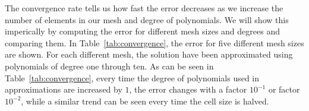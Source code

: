 The convergence rate tells us how fast the error decreases as we increase the number of elements in our mesh and degree of polynomials.
We will show this imperically by computing the error for different mesh sizes and degrees and comparing them. 
In Table~\ref{tab:convergence}, 
the error for five different mesh sizes are shown. 
For each different mesh, the solution have been approximated using polynomials of degree one through ten.
As can be seen in Table~\ref{tab:convergence}, every time the degree of polynomials used in 
approximations are increased by $1$, the error changes with a factor $10^{-1}$ or factor 
$10^{-2}$, while a similar trend can be seen every time the cell size is halved. 

